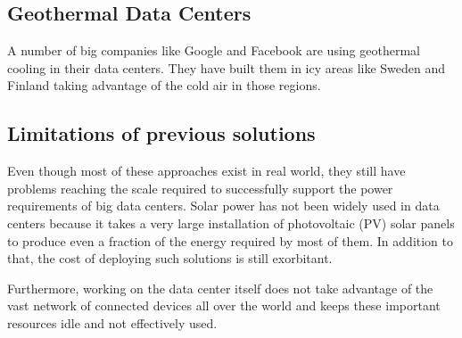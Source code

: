     \subsection{Geothermal Data Centers}
        A number of big companies like Google and Facebook are using geothermal cooling in their data centers.
        They have built them in icy areas like Sweden and Finland taking advantage of the cold air in those
        regions.

    \subsection{Limitations of previous solutions}
        Even though most of these approaches exist in real world, they still have problems reaching the scale
        required to successfully support the power requirements of big data centers.
        Solar power has not been widely used in data centers because it takes a very large installation of
        photovoltaic (PV) solar panels to produce even a fraction of the energy required by most of them.
        In addition to that, the cost of deploying such solutions is still exorbitant.

        Furthermore, working on the data center itself does not take advantage of the vast network of connected
        devices all over the world and keeps these important resources idle and not effectively used.

